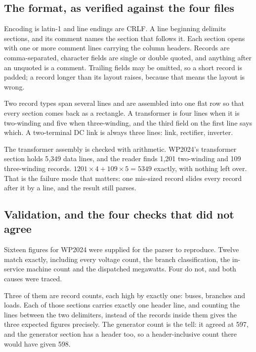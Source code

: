\documentclass[11pt,a4paper]{article}
\begin{document}
\subsection{The format, as verified against the four files}

Encoding is latin-1 and line endings are CRLF. A line beginning 
delimits sections, and its comment names the section that follows it. Each
section opens with one or more  comment lines carrying the column
headers. Records are comma-separated, character fields are single or double
quoted, and anything after an unquoted \code{/} is a comment. Trailing fields
may be omitted, so a short record is padded; a record longer than its layout
raises, because that means the layout is wrong.

Two record types span several lines and are assembled into one flat row so that
every section comes back as a rectangle. A transformer is four lines when it is
two-winding and five when three-winding, and the third field on the first line
says which. A two-terminal DC link is always three lines: link, rectifier,
inverter.

The transformer assembly is checked with arithmetic. WP2024's
transformer section holds 5{,}349 data lines, and the reader finds 1{,}201
two-winding and 109 three-winding records. $1201 \times 4 + 109 \times 5 =
5349$ exactly, with nothing left over. That is the failure mode that matters:
one mis-sized record slides every record after it by a line, and the result
still parses.

\subsection{Validation, and the four checks that did not agree}

Sixteen figures for WP2024 were supplied for the parser to reproduce. Twelve
match exactly, including every voltage count, the branch classification, the
in-service machine count and the dispatched megawatts. Four do not, and both
causes were traced.

Three of them are record counts, each high by exactly one: buses, branches and
loads. Each of those sections carries exactly one  header line, and
counting the lines between the two delimiters, instead of the records inside
them gives the three expected figures precisely. The generator count is the
tell: it agreed at 597, and the generator section has a header too, so a
header-inclusive count there would have given 598.
\end{document}
